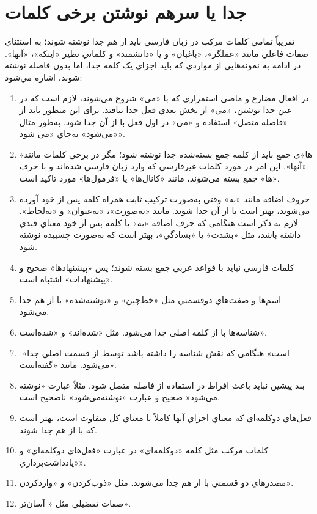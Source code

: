 \section{جدا یا سرهم نوشتن برخی کلمات}
تقريباً تمامي کلمات مرکب در زبان فارسي بايد از هم جدا نوشته شوند؛ به استثناي صفات فاعلي مانند «عملگر»، «باغبان» و يا «دانشمند» و کلماتي نظير «اينکه»، «آنها». در ادامه به نمونه‌هايي از مواردي که بايد اجزاي يک کلمه جدا، اما بدون فاصله نوشته شوند، اشاره مي‌شود‌:
\begin{enumerate}
\item
در افعال مضارع و ماضی استمراری که با «می» شروع می‌شوند، لازم است که در عين جدا نوشتن، «می» از بخش بعدي فعل جدا نيافتد‌.‌ برای اين منظور بايد از «فاصله متصل» استفاده و «می» در اول فعل با  از آن جدا شود.‌ به‌طور مثال «می‌شود» به‌جاي «می شود». 
\item
	«ها»ی جمع بايد از کلمه جمع بسته‌شده جدا نوشته شود؛ مگر در برخی کلمات مانند «آنها». اين امر در مورد کلمات غير‌فارسي که وارد زبان فارسي شده‌اند و با حرف «ها» جمع بسته می‌شوند، مانند «کانال‌ها» يا «فرمول‌ها» مورد تاکيد است.
\item
	حروف اضافه مانند «به» وقتي به‌صورت ترکيب ثابت همراه کلمه پس از خود آورده می‌شوند، بهتر است با  از آن جدا شوند‌.‌ مانند «به‌صورت»، «به‌عنوان» و «به‌‌‌لحاظ»‌.‌ لازم به ذکر است هنگامی که حرف اضافه «به» با کلمه پس از خود معناي قيدي داشته باشد، مثل «بشدت» يا «بسادگي»، بهتر است که به‌صورت چسبيده نوشته شود‌.
\item
	کلمات فارسی نبايد با قواعد عربی جمع بسته شوند؛ پس «پيشنهادها» صحيح و «پيشنهادات» اشتباه است‌.‌
\item
	اسم‌ها و صفت‌هاي دو‌قسمتي مثل «خط‌چين» و «نوشته‌شده» با  از هم جدا می‌شود‌.‌
\item
	شناسه‌ها با  از کلمه اصلي جدا می‌شود‌.‌ مثل «شده‌اند»‌ و «شده‌است». 
\item
	‌ «است» هنگامی که نقش شناسه را داشته باشد توسط  از قسمت اصلي جدا می‌شود‌.‌ مانند «گفته‌است»‌.
\item
	بند پیشین نبايد باعث افراط در استفاده از فاصله متصل شود. مثلاً عبارت «نوشته می‌شود‌« صحيح و عبارت «نوشته‌می‌شود» ناصحیح است. 
\item
	فعل‌هاي دو‌کلمه‌اي که معناي اجزاي آنها کاملاً با معناي کل متفاوت است، بهتر است که با  از هم جدا ‌شوند‌.‌
\item
	کلمات مرکب مثل کلمه «دوکلمه‌اي» در عبارت «فعل‌هاي دوکلمه‌اي» و «يادداشت‌برداري».
\item
	مصدرهاي دو قسمتي با  از هم جدا می‌شوند‌.‌ مثل «ذوب‌کردن» و «واردکردن»‌.
\item
	 صفات تفضيلي مثل « آسان‌تر».
\end{enumerate}

